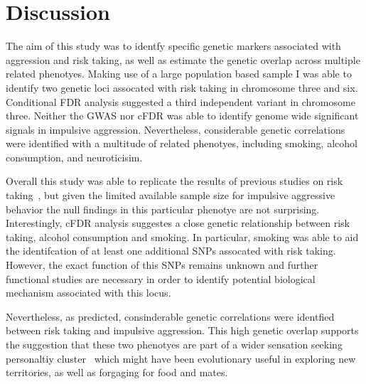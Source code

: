 \section{Discussion}
\label{sec:ukb_assc_discussion}

The aim of this study was to identfy specific genetic markers associated with aggression and risk taking,
as well as estimate the genetic overlap across multiple related phenotyes.
Making use of a large population based sample I was able to identify two genetic loci assocated with risk taking in chromosome three and six.
Conditional FDR analysis suggested a third independent variant in chromosome three.
Neither the GWAS nor cFDR was able to identify genome wide significant signals in impulsive aggression.
Nevertheless, considerable genetic correlations were identified with a multitude of related phenotyes, including smoking, alcohol consumption, and neuroticisim.

Overall this study was able to replicate the results of previous studies on risk taking~\cite{Day2016}, but given the limited available sample size for impulsive aggressive behavior the null findings in this particular phenotye are not surprising.
Interestingly, cFDR analysis suggestes a close genetic relationship between risk taking, alcohol consumption and smoking.
In particular, smoking was able to aid the identifcation of at least one additional SNPs assocated with risk taking.
However, the exact function of this SNPs remains unknown and further functional studies are necessary in order to identify potential biological mechanism associated with this locus.

Nevertheless, as predicted, consinderable genetic correlations were identfied between risk taking and impulsive aggression.
This high genetic overlap supports the suggestion that these two phenotyes are part of a wider sensation seeking personaltiy cluster~\cite{Zuckerman2000} which might have been evolutionary useful in exploring new territories, as well as forgaging for food and mates.

